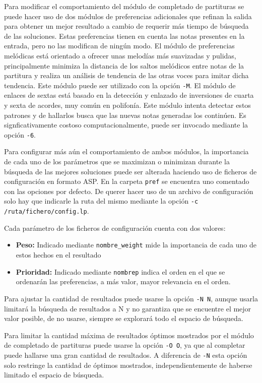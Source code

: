 Para modificar el comportamiento del módulo de completado de partituras se puede hacer uso de dos módulos de preferencias adicionales que refinan la salida para obtener un mejor resultado a cambio de requerir más tiempo de búsqueda de las soluciones. Estas preferencias tienen en cuenta las notas presentes en la entrada, pero no las modifican de ningún modo. 
El módulo de preferencias melódicas está orientado a ofrecer unas melodías más suavizadas y pulidas, principalmente minimiza la distancia de los saltos melódicos entre notas de la partitura y realiza un análisis de tendencia de las otras voces para imitar dicha tendencia. Este módulo puede ser utilizado con la opción \texttt{-M}.
El módulo de enlaces de sextas está basado en la detección y enlazado de inversiones de cuarta y sexta de acordes, muy común en polifonía. Este módulo intenta detectar estos patrones y de hallarlos busca que las nuevas notas generadas los continúen. Es signficativamente costoso computacionalmente, puede ser invocado mediante la opción \texttt{-6}.

Para configurar más aún el comportamiento de ambos módulos, la importancia de cada uno de los parámetros que se maximizan o minimizan durante la búsqueda de las mejores soluciones puede ser alterada haciendo uso de ficheros de configuración en formato ASP. En la carpeta \texttt{pref} se encuentra uno comentado con las opciones por defecto. De querer hacer uso de un archivo de configuración solo hay que indicarle la ruta del mismo mediante la opción \texttt{-c /ruta/fichero/config.lp}. 

Cada parámetro de los ficheros de configuración cuenta con dos valores:
\begin{itemize}
	\item \textbf{Peso:} Indicado mediante \texttt{nombre\_weight} mide la importancia de cada uno de estos hechos en el resultado
	\item \textbf{Prioridad:} Indicado mediante \texttt{nombrep} indica el orden en el que se ordenarán las preferencias, a más valor, mayor relevancia en el orden.
\end{itemize}

Para ajustar la cantidad de resultados puede usarse la opción \texttt{-N N}, aunque usarla limitará la búsqueda de resultados a N y no garantiza que se encuentre el mejor valor posible, de no usarse, siempre se explorará todo el espacio de búsqueda.

Para limitar la cantidad máxima de resultados óptimos mostrados por el módulo de completado de partituras puede usarse la opción \texttt{-O O}, ya que al completar puede hallarse una gran cantidad de resultados. A diferencia de \texttt{-N} esta opción solo restringe la cantidad de óptimos mostrados, independientemente de haberse limitado el espacio de búsqueda.

